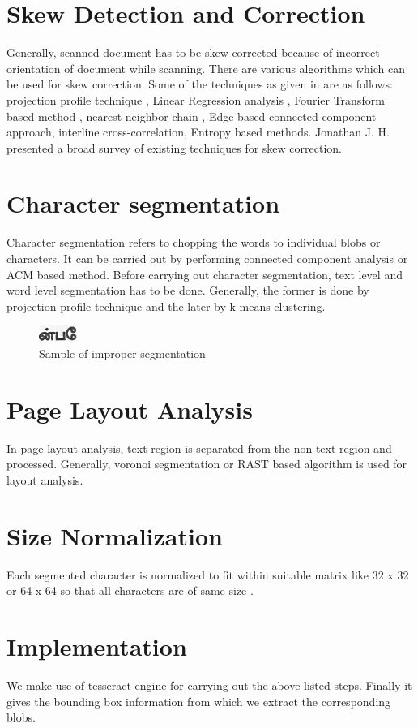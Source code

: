 \section{Skew Detection and Correction}
Generally, scanned document has to be skew-corrected because of incorrect orientation of 
document while scanning. There are various algorithms which can be used for skew correction. 
Some of the techniques as given in \cite{praveen} are as follows: projection profile technique , Linear Regression analysis , Fourier Transform based method , nearest neighbor chain , Edge based connected component approach, interline cross-correlation, Entropy based methods. Jonathan J. H. presented a broad survey of existing techniques for skew correction.


\section{Character segmentation}
Character segmentation refers to chopping the words  to individual blobs or characters. It can be carried out by performing connected component analysis\cite{praveen} or ACM based method. 
Before carrying out character segmentation, text level and word level segmentation has to be done.
Generally, the former is done by projection profile technique and the later by k-means clustering\cite{praveen}.
\begin{figure}\centering
\includegraphics[scale=0.3]{./img/junk}
  \caption{Sample of improper segmentation}\label{JUNK}
\end{figure}

\section{Page Layout Analysis}
In page layout analysis, text region is separated from the non-text region and processed. Generally,
voronoi segmentation or RAST based algorithm\cite{amy} is used for layout analysis.
\section{Size Normalization}
Each segmented character is normalized to fit within suitable matrix like 32 x 32 or 64 x 64 so that all characters are of  same size .
\section{Implementation}
We make use of tesseract engine for carrying out the above listed steps. Finally it gives the 
bounding box information from which we extract the corresponding blobs.